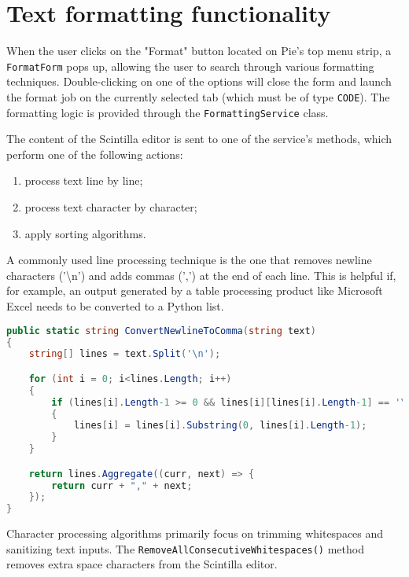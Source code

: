 \section{Text formatting functionality}

When the user clicks on the "Format" button located on Pie's top menu strip, a \texttt{FormatForm} pops up, allowing the user to search through various formatting techniques. Double-clicking on one of the options will close the form and launch the format job on the currently selected tab (which must be of type \texttt{CODE}). The formatting logic is provided through the \texttt{FormattingService} class.

The content of the Scintilla editor is sent to one of the service's methods, which perform one of the following actions:

\begin{enumerate}
  \item process text line by line;
  \item process text character by character;
  \item apply sorting algorithms.
\end{enumerate}

A commonly used line processing technique is the one that removes newline characters ('\textbackslash n') and adds commas (',') at the end of each line. This is helpful if, for example, an output generated by a table processing product like Microsoft Excel needs to be converted to a Python list.

\begin{lstlisting}[language=csharp, caption={Converting newline to commas using the ConvertNewlineToComma() method from the FormattingService class}]
public static string ConvertNewlineToComma(string text)
{
    string[] lines = text.Split('\n');

    for (int i = 0; i<lines.Length; i++)
    {
        if (lines[i].Length-1 >= 0 && lines[i][lines[i].Length-1] == '\r')
        {
            lines[i] = lines[i].Substring(0, lines[i].Length-1);
        }
    }

    return lines.Aggregate((curr, next) => {
        return curr + "," + next;
    });
}
\end{lstlisting}

Character processing algorithms primarily focus on trimming whitespaces and sanitizing text inputs. The \texttt{RemoveAllConsecutiveWhitespaces()} method removes extra space characters from the Scintilla editor.

